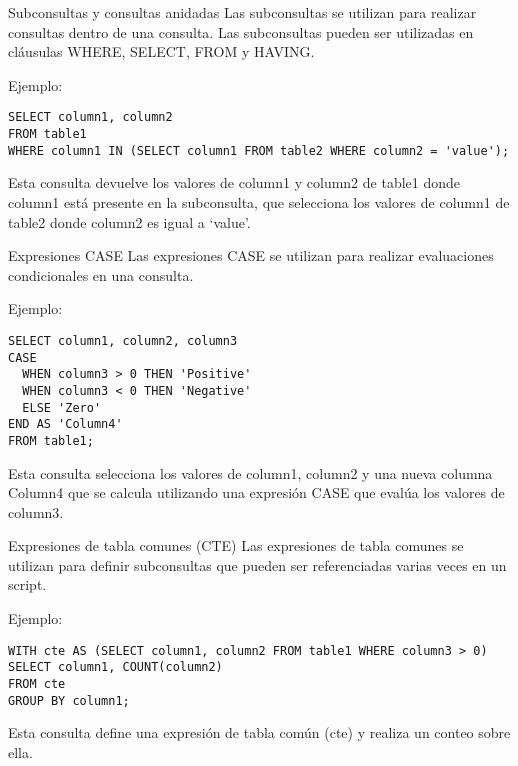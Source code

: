 \begin{frame}[fragile]{Subconsultas y consultas anidadas}
\protect\hypertarget{subconsultas-y-consultas-anidadas}{}
Las subconsultas se utilizan para realizar consultas dentro de una
consulta. Las subconsultas pueden ser utilizadas en cláusulas WHERE,
SELECT, FROM y HAVING.

Ejemplo:

\begin{verbatim}
SELECT column1, column2 
FROM table1 
WHERE column1 IN (SELECT column1 FROM table2 WHERE column2 = 'value');
\end{verbatim}

Esta consulta devuelve los valores de column1 y column2 de table1 donde
column1 está presente en la subconsulta, que selecciona los valores de
column1 de table2 donde column2 es igual a `value'.
\end{frame}

\begin{frame}[fragile]{Expresiones CASE}
\protect\hypertarget{expresiones-case}{}
Las expresiones CASE se utilizan para realizar evaluaciones
condicionales en una consulta.

Ejemplo:

\begin{verbatim}
SELECT column1, column2, column3 
CASE 
  WHEN column3 > 0 THEN 'Positive' 
  WHEN column3 < 0 THEN 'Negative'
  ELSE 'Zero' 
END AS 'Column4' 
FROM table1;
\end{verbatim}

Esta consulta selecciona los valores de column1, column2 y una nueva
columna Column4 que se calcula utilizando una expresión CASE que evalúa
los valores de column3.
\end{frame}

\begin{frame}[fragile]{Expresiones de tabla comunes (CTE)}
\protect\hypertarget{expresiones-de-tabla-comunes-cte}{}
Las expresiones de tabla comunes se utilizan para definir subconsultas
que pueden ser referenciadas varias veces en un script.

Ejemplo:

\begin{verbatim}
WITH cte AS (SELECT column1, column2 FROM table1 WHERE column3 > 0)
SELECT column1, COUNT(column2) 
FROM cte 
GROUP BY column1;
\end{verbatim}

Esta consulta define una expresión de tabla común (cte) y realiza un
conteo sobre ella.
\end{frame}
